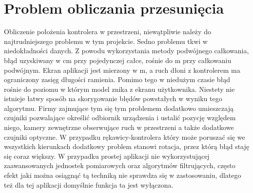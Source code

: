 
  \section{Problem obliczania przesunięcia}
 \label{sec:iuPrzesunięcie}
 Obliczenie położenia kontrolera w przestrzeni, niewątpliwie należy do najtrudniejszego problemu w tym projekcie. Sedno problemu tkwi w niedokładności danych. Z powodu wykorzystania metody podwójnego całkowania, błąd uzyskiwany w cm przy pojedynczej całce, rośnie do m przy całkowaniu podwójnym. Ekran aplikacji jest mierzony w m, a ruch dłoni z kontrolerem ma ograniczony zasięg długości ramienia. Pomimo tego w niedużym czasie błąd rośnie do poziomu w którym model znika z ekranu użytkownika. Niestety nie istnieje łatwy sposób na skorygowanie błędów powstałych w wyniku tego algorytmu. Firmy zajmujące tym się tym problemem dodatkowo umieszczają czujniki pozwalające określić odbiornik urządzenia i ustalić pozycję względem niego, kamery zewnętrzne obserwujące ruch w przestrzeni a także dodatkowe czujniki optyczne. W przypadku rękawicy-kontrolera który może poruszać się we wszystkich kierunkach dodatkowy problem stanowi rotacja, przez którą błąd staję się coraz większy. W przypadku prostej aplikacji nie wykorzystującej zaawansowanych jednostek pomiarowych oraz algorytmów filtrujących, często efekt jaki można osiągnąć tą techniką nie sprawdza się w zastosowaniu, dlatego też dla tej aplikacji domyślnie funkcja ta jest wyłączona. 
 
 